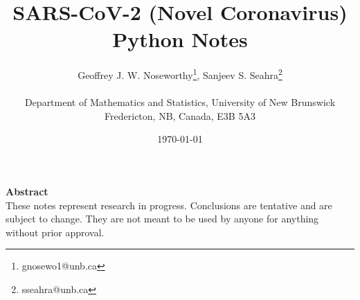 \documentclass{article}
\numberwithin{equation}{section} %
\begin{document}
\title{SARS-CoV-2 (Novel Coronavirus) Python Notes}
\date{\today}
\author{Geoffrey J. W. Noseworthy\footnote{gnosewo1@unb.ca}, Sanjeev S. Seahra\footnote{sseahra@unb.ca} \\ \\ Department of Mathematics and Statistics, University of New Brunswick \\ Fredericton, NB, Canada, E3B 5A3}

\maketitle

\newpage

{\centering \Large \textbf{Abstract} \\
  \normalsize These notes represent research in progress. Conclusions are tentative and are subject to change. They are not meant to be used by anyone for anything without prior approval.}

\tableofcontents

\newpage
\end{document}
